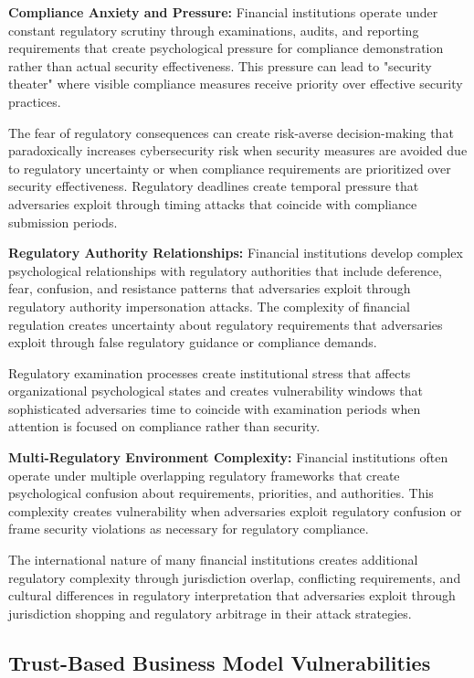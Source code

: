 \documentclass[10pt, twocolumn]{article}
\begin{document}
\textbf{Compliance Anxiety and Pressure:} Financial institutions operate under constant regulatory scrutiny through examinations, audits, and reporting requirements that create psychological pressure for compliance demonstration rather than actual security effectiveness. This pressure can lead to "security theater" where visible compliance measures receive priority over effective security practices.

The fear of regulatory consequences can create risk-averse decision-making that paradoxically increases cybersecurity risk when security measures are avoided due to regulatory uncertainty or when compliance requirements are prioritized over security effectiveness. Regulatory deadlines create temporal pressure that adversaries exploit through timing attacks that coincide with compliance submission periods.

\textbf{Regulatory Authority Relationships:} Financial institutions develop complex psychological relationships with regulatory authorities that include deference, fear, confusion, and resistance patterns that adversaries exploit through regulatory authority impersonation attacks. The complexity of financial regulation creates uncertainty about regulatory requirements that adversaries exploit through false regulatory guidance or compliance demands.

Regulatory examination processes create institutional stress that affects organizational psychological states and creates vulnerability windows that sophisticated adversaries time to coincide with examination periods when attention is focused on compliance rather than security.

\textbf{Multi-Regulatory Environment Complexity:} Financial institutions often operate under multiple overlapping regulatory frameworks that create psychological confusion about requirements, priorities, and authorities. This complexity creates vulnerability when adversaries exploit regulatory confusion or frame security violations as necessary for regulatory compliance.

The international nature of many financial institutions creates additional regulatory complexity through jurisdiction overlap, conflicting requirements, and cultural differences in regulatory interpretation that adversaries exploit through jurisdiction shopping and regulatory arbitrage in their attack strategies.

\subsection{Trust-Based Business Model Vulnerabilities}
\end{document}
